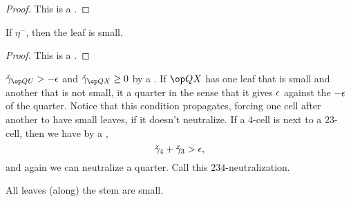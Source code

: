 \begin{proof} This is a .
\end{proof}

\begin{lemma} If $\eta^-$, then the leaf is small.
\end{lemma}

\begin{proof} This is a .
\end{proof}

\begin{remark}[neutralize]
 $\gg_{\QU} > -\eps$ and $\gg_{\QX}\ge 0$ by a .
If $\QX$ has one leaf that is small and another that is not small, 
it  a quarter in the
sense that it gives $\epsilon$ against the $-\epsilon$ of the quarter.
Notice that this condition propagates, forcing one cell after another to have
small leaves, if it doesn't neutralize.
If a $4$-cell is next to a $23$-cell, then we have by a ,
\[
\check\gamma_4 + \check\gamma_3 > \epsilon,
\]
and again we can neutralize a quarter.  Call this $234$-neutralization.
\end{remark}

\begin{lemma}  All leaves (along) the stem are small.
\end{lemma}

